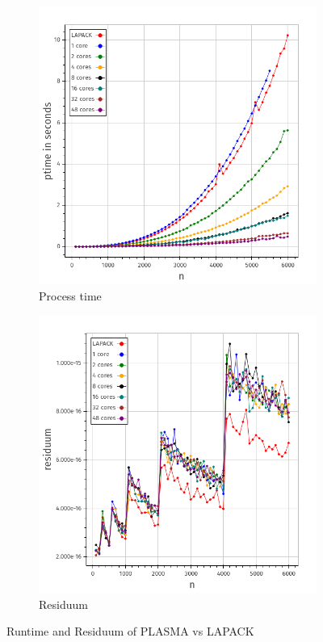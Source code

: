 \documentclass[a4paper,final,ngerman,english]{article}
\begin{document}
\begin{figure}[h!]
	\centering
	\begin{subfigure}{0.46\textwidth}
		\includegraphics[width=\textwidth]{ptime}
		\caption{Process time}
\label{fig:runtime}
	\end{subfigure}
	\begin{subfigure}{0.46\textwidth}
		\includegraphics[width=\textwidth]{res}
		\caption{Residuum}
\label{fig:residuum}
	\end{subfigure}
	\caption{Runtime and Residuum of PLASMA vs LAPACK}
\end{figure}
\end{document}
